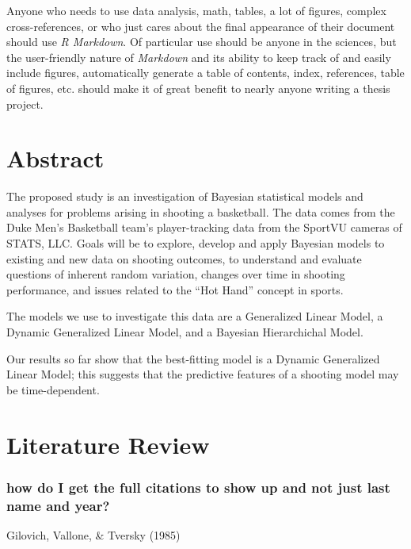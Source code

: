 \documentclass[12pt,twoside]{dukestatscithesis}
\theoremstyle{definition}
\theoremstyle{definition}
\theoremstyle{definition}
\theoremstyle{remark}
\begin{document}
Anyone who needs to use data analysis, math, tables, a lot of figures,
complex cross-references, or who just cares about the final appearance
of their document should use \emph{R Markdown}. Of particular use should
be anyone in the sciences, but the user-friendly nature of
\emph{Markdown} and its ability to keep track of and easily include
figures, automatically generate a table of contents, index, references,
table of figures, etc. should make it of great benefit to nearly anyone
writing a thesis project.

\chapter{Abstract}\label{abstract}

The proposed study is an investigation of Bayesian statistical models
and analyses for problems arising in shooting a basketball. The data
comes from the Duke Men's Basketball team's player-tracking data from
the SportVU cameras of STATS, LLC. Goals will be to explore, develop and
apply Bayesian models to existing and new data on shooting outcomes, to
understand and evaluate questions of inherent random variation, changes
over time in shooting performance, and issues related to the ``Hot
Hand'' concept in sports.

\par

The models we use to investigate this data are a Generalized Linear
Model, a Dynamic Generalized Linear Model, and a Bayesian Hierarchichal
Model.

\par

Our results so far show that the best-fitting model is a Dynamic
Generalized Linear Model; this suggests that the predictive features of
a shooting model may be time-dependent.

\chapter{Literature Review}\label{litreview}

\subsection{how do I get the full citations to show up and not just last
name and
year?}\label{how-do-i-get-the-full-citations-to-show-up-and-not-just-last-name-and-year}

Gilovich, Vallone, \& Tversky (1985)
\end{document}
